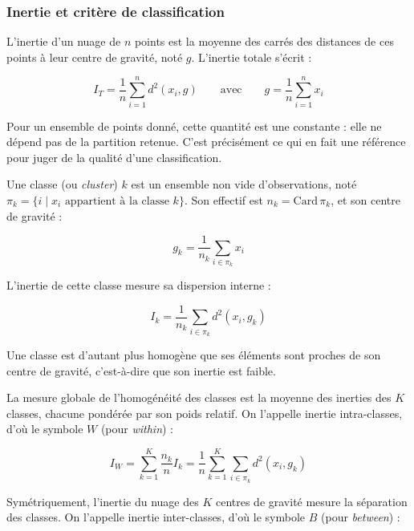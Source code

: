 \subsubsection*{Inertie et critère de classification}

L'inertie d'un nuage de $n$ points est la moyenne des carrés des distances de ces points à leur centre de gravité, noté $g$. L'inertie totale s'écrit :

\begin{equation}
    I_T = \frac{1}{n} \sum_{i=1}^{n} d^2(x_i, g) \qquad \text{avec} \qquad g = \frac{1}{n} \sum_{i=1}^{n} x_i
\end{equation}

Pour un ensemble de points donné, cette quantité est une constante : elle ne dépend pas de la partition retenue. C'est précisément ce qui en fait une référence pour juger de la qualité d'une classification.

Une classe (ou \textit{cluster}) $k$ est un ensemble non vide d'observations, noté $\pi_k = \{ i \mid x_i \text{ appartient à la classe } k \}$. Son effectif est $n_k = \text{Card}\, \pi_k$, et son centre de gravité :

\begin{equation}
    g_k = \frac{1}{n_k} \sum_{i \in \pi_k} x_i
\end{equation}

L'inertie de cette classe mesure sa dispersion interne :

\begin{equation}
    I_k = \frac{1}{n_k} \sum_{i \in \pi_k} d^2(x_i, g_k)
\end{equation}

Une classe est d'autant plus homogène que ses éléments sont proches de son centre de gravité, c'est-à-dire que son inertie est faible.

La mesure globale de l'homogénéité des classes est la moyenne des inerties des $K$ classes, chacune pondérée par son poids relatif. On l'appelle inertie intra-classes, d'où le symbole $W$ (pour \textit{within}) :

\begin{equation}
    I_W = \sum_{k=1}^{K} \frac{n_k}{n} I_k = \frac{1}{n} \sum_{k=1}^{K} \sum_{i \in \pi_k} d^2(x_i, g_k)
\end{equation}

Symétriquement, l'inertie du nuage des $K$ centres de gravité mesure la séparation des classes. On l'appelle inertie inter-classes, d'où le symbole $B$ (pour \textit{between}) :

